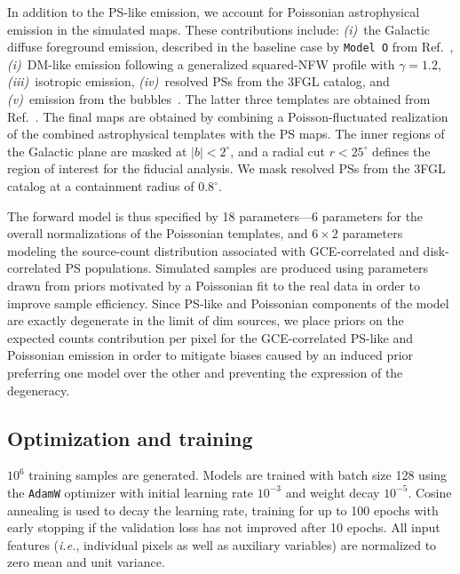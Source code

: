 \documentclass[prd,aps,10pt,nofootinbib,twocolumn,superscriptaddress,preprintnumbers,balancelastpage,longbibliography]{revtex4-1}
\begin{document}
In addition to the PS-like emission, we account for Poissonian astrophysical emission in the simulated maps.  These contributions include: \emph{(i)}~the Galactic diffuse foreground emission, described in the baseline case by \texttt{Model~O} from Ref.~\cite{Buschmann:2020adf}, \emph{(i)}~DM-like emission following a generalized squared-NFW profile with $\gamma=1.2$, \emph{(iii)}~isotropic emission, \emph{(iv)}~resolved PSs from the 3FGL catalog, and \emph{(v)}~emission from the \Fermi bubbles~\cite{Su:2010qj}. The latter three templates are obtained from Ref.~\cite{rodd_nicholas_safdi_siddharth_2016}. The final maps are obtained by combining a Poisson-fluctuated realization of the combined astrophysical templates with the PS maps. The inner regions of the Galactic plane are masked at $|b| < 2^\circ$, and a radial cut $r < 25^\circ$ defines the region of interest for the fiducial analysis. We mask resolved PSs from the 3FGL catalog at a containment radius of $0.8^\circ$.   

The forward model is thus specified by 18 parameters---6 parameters for the overall normalizations of the Poissonian templates, and $6\times2$ parameters modeling the source-count distribution associated with GCE-correlated and disk-correlated PS populations. Simulated samples are produced using parameters drawn from priors motivated by a Poissonian fit to the real \Fermi data in order to improve sample efficiency. Since PS-like and Poissonian components of the model are exactly degenerate in the limit of dim sources, we place priors on the expected counts contribution per pixel for the GCE-correlated PS-like and Poissonian emission in order to mitigate biases caused by an induced prior preferring one model over the other and preventing the expression of the degeneracy.

\subsection{Optimization and training}

$10^{6}$ training samples are generated. Models are trained with batch size 128 using the \texttt{AdamW} optimizer with initial learning rate $10^{-3}$ and weight decay $10^{-5}$. Cosine annealing is used to decay the learning rate, training for up to 100 epochs with early stopping if the validation loss has not improved after 10 epochs. All input features (\emph{i.e.}, individual pixels as well as auxiliary variables) are normalized to zero mean and unit variance.
\end{document}
